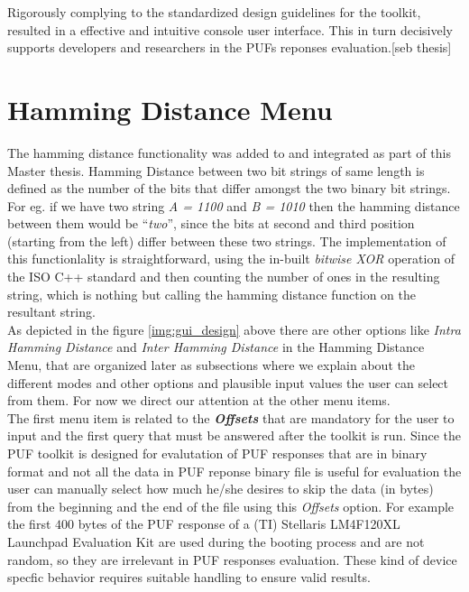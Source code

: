 Rigorously complying to the standardized design guidelines for the toolkit, resulted in a effective and intuitive console user interface.
This in turn decisively supports developers and researchers in the PUFs reponses evaluation.[seb thesis]

\section{Hamming Distance Menu}
\label{Hamming_Distance_menu}
The hamming distance functionality was added to and integrated as part of this Master thesis. Hamming Distance between two bit strings of same length is defined as the number of the bits that differ amongst the two binary bit strings. For eg. if we have two string \emph{A = 1100} and \emph{B = 1010} then the hamming distance between them would be ``\emph{two}'', since the bits at second and third position (starting from the left) differ between these two strings. The implementation of
this functionlality is straightforward, using the in-built \emph{bitwise XOR} operation of the ISO C++ standard and then counting the number of ones in the resulting string, which is nothing but calling the hamming distance function on the resultant string.\\

As depicted in the figure \ref{img:gui_design} above there are other options like \emph{Intra Hamming Distance} and \emph{Inter Hamming Distance} in the Hamming Distance Menu, that are organized later as subsections where we explain about the different modes and other options and plausible input values the user can select from them. For now we direct our attention at the other menu items.\\

The first menu item is related to the \emph{\textbf{Offsets}} that are mandatory for the user to input and the first query that must be answered after the toolkit is run. Since the PUF toolkit is designed for evalutation of PUF responses that are in binary format and not all the data in PUF reponse binary file is useful for evaluation the user can manually select how much he/she desires to skip the data (in bytes) from the beginning and the end of the file using this \emph{Offsets} option.
For example the first $400$ bytes of the PUF response of a (TI) Stellaris LM4F120XL Launchpad Evaluation Kit are used during the booting process and are not random, so they are irrelevant in PUF responses evaluation. These kind of device specfic behavior requires suitable handling to ensure valid results.\\

